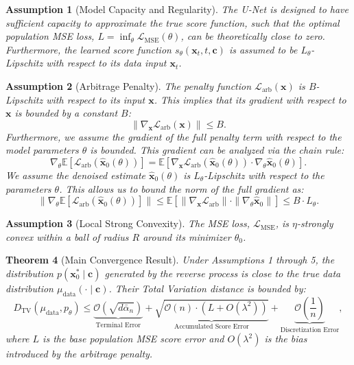 \documentclass{article}
\newtheorem{theorem}{Theorem}[section]
\newtheorem{assumption}[theorem]{Assumption}
\begin{document}
\begin{assumption}[Model Capacity and Regularity] \label{ass:capacity}
The U-Net is designed to have sufficient capacity to approximate the true score function, such that the optimal population MSE loss, $L = \inf_\theta \mathcal{L}_{\text{MSE}}(\theta)$, can be theoretically close to zero. Furthermore, the learned score function $s_\theta(\mathbf{x}_t, t, \mathbf{c})$ is assumed to be $L_\theta$-Lipschitz with respect to its data input $\mathbf{x}_t$.
\end{assumption}

\begin{assumption}[Arbitrage Penalty] \label{ass:penalty}
The penalty function $\mathcal{L}_{\text{arb}}(\mathbf{x})$ is $B$-Lipschitz with respect to its input $\mathbf{x}$. This implies that its gradient with respect to $\mathbf{x}$ is bounded by a constant $B$:
\[
\|\nabla_\mathbf{x} \mathcal{L}_{\text{arb}}(\mathbf{x})\| \le B.
\]
Furthermore, we assume the gradient of the full penalty term with respect to the model parameters $\theta$ is bounded. This gradient can be analyzed via the chain rule:
\[
\nabla_\theta \mathbb{E}[\mathcal{L}_{\text{arb}}(\hat{\mathbf{x}}_0(\theta))] = \mathbb{E}[\nabla_\mathbf{x} \mathcal{L}_{\text{arb}}(\hat{\mathbf{x}}_0(\theta)) \cdot \nabla_\theta \hat{\mathbf{x}}_0(\theta)].
\]
We assume the denoised estimate $\hat{\mathbf{x}}_0(\theta)$ is $L_\theta$-Lipschitz with respect to the parameters $\theta$. This allows us to bound the norm of the full gradient as:
\[
\|\nabla_\theta \mathbb{E}[\mathcal{L}_{\text{arb}}(\hat{\mathbf{x}}_0(\theta))]\| \le \mathbb{E}[\|\nabla_\mathbf{x} \mathcal{L}_{\text{arb}}\| \cdot \|\nabla_\theta \hat{\mathbf{x}}_0\|] \le B \cdot L_\theta.
\]
\end{assumption}

\begin{assumption}[Local Strong Convexity] \label{ass:local_strong_convexity}
The MSE loss, $\mathcal{L}_{\text{MSE}}$, is $\eta$-strongly convex within a ball of radius $R$ around its minimizer $\theta_0$.
\end{assumption}

\begin{theorem}[Main Convergence Result]
Under Assumptions 1 through 5, the distribution $p(\mathbf{x}_0^* \mid \mathbf{c})$ generated by the reverse process is close to the true data distribution $\mu_{\text{data}}(\cdot \mid \mathbf{c})$. Their Total Variation distance is bounded by:
\[
D_{\text{TV}}(\mu_{\text{data}}, p_\theta) \le \underbrace{\mathcal{O}(\sqrt{d \bar{\alpha}_n})}_{\text{Terminal Error}} + \underbrace{\sqrt{\mathcal{O}(n) \cdot (L + O(\lambda^2))}}_{\text{Accumulated Score Error}} + \underbrace{\mathcal{O}\left(\frac{1}{n}\right)}_{\text{Discretization Error}},
\]
where $L$ is the base population MSE score error and $O(\lambda^2)$ is the bias introduced by the arbitrage penalty.
\end{theorem}
\end{document}
